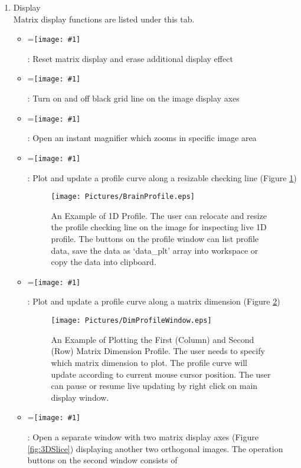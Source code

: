 \documentclass{book}%
\newcommand{\vcenteredinclude}[1]{
\begingroup
\setbox0=\hbox{\texttt{[image: \#1]}}
\parbox{\wd0}{\box0}\endgroup}
\begin{document}
	\begin{enumerate}

	\item Display \\
	
	Matrix display functions are listed under this tab. 
	
	\begin{itemize}
		\item \vcenteredinclude{Pictures/Release.eps} : Reset matrix display and erase additional display effect
		\item \vcenteredinclude{Pictures/Grid.eps} : Turn on and off black grid line on the image display axes
		\item \vcenteredinclude{Pictures/Magnifier.eps} : Open an instant magnifier which zooms in specific image area
		\item \vcenteredinclude{Pictures/LineProfile.eps} : Plot and update a profile curve along a resizable checking line (Figure \ref{fig:BrainProfile})
		
		\begin{figure}[htbp]
			\centering
				\texttt{[image: Pictures/BrainProfile.eps]}
			\caption{An Example of 1D Profile. The user can relocate and resize the profile checking line on the image for inspecting live 1D profile. The buttons on the profile window 
							 can list profile data, save the data as `data\_plt' array into workspace or copy the data into clipboard.}
			\label{fig:BrainProfile}
		\end{figure}	
		
		
		\item \vcenteredinclude{Pictures/DimProfile.eps} : Plot and update a profile curve along a matrix dimension (Figure \ref{fig:DimProfileWindow})
		
		\begin{figure}[htbp]
			\centering
				\texttt{[image: Pictures/DimProfileWindow.eps]}
			\caption{An Example of Plotting the First (Column) and Second (Row) Matrix Dimension Profile. The user needs to specify which matrix dimension to plot. The profile curve will update according to current mouse cursor position. The user can pause or resume live updating by right click on main display window.}
			\label{fig:DimProfileWindow}
		\end{figure}	
		
		\item \vcenteredinclude{Pictures/3DSlicer.eps} : Open a separate window with two matrix display axes (Figure \ref{fig:3DSlice}) displaying another two orthogonal images. The operation buttons on the second window consists of 


\end{itemize}
\end{enumerate}
\end{document}
